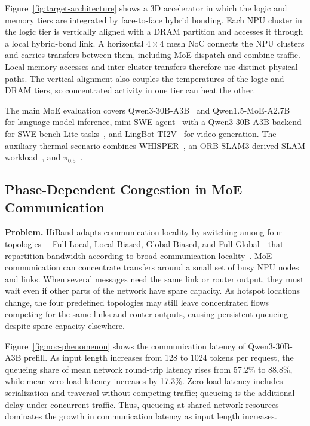 \documentclass[conference,10pt]{IEEEtran}
\begin{document}
Figure~\ref{fig:target-architecture} shows a 3D accelerator in which the
logic and memory tiers are integrated by face-to-face hybrid bonding.
Each NPU cluster in the logic tier is vertically aligned with a DRAM
partition and accesses it through a local hybrid-bond link. A horizontal
$4\times4$ mesh NoC connects the NPU clusters and carries transfers between
them, including MoE dispatch and combine traffic. Local memory accesses and
inter-cluster transfers therefore use distinct physical paths. The vertical
alignment also couples the temperatures of the logic and DRAM tiers, so
concentrated activity in one tier can heat the other.

The main MoE evaluation covers Qwen3-30B-A3B~\cite{qwen3report} and
Qwen1.5-MoE-A2.7B~\cite{qwen15moe} for language-model inference,
mini-SWE-agent~\cite{minisweagent} with a Qwen3-30B-A3B backend for
SWE-bench Lite tasks~\cite{swebench}, and LingBot TI2V~\cite{lingbotvideo}
for video generation. The auxiliary thermal scenario combines
WHISPER~\cite{whisper}, an ORB-SLAM3-derived SLAM workload~\cite{orbslam3},
and $\pi_{0.5}$~\cite{pi05}.


\subsection{Phase-Dependent Congestion in MoE Communication}

\noindent\textbf{Problem.}
HiBand adapts communication locality by switching among four topologies---
Full-Local, Local-Biased, Global-Biased, and Full-Global---that repartition
bandwidth according to broad communication locality~\cite{wang2026hiband}.
MoE communication can concentrate transfers around a small set of busy NPU
nodes and links. When several messages need the same link or router output,
they must wait even if other parts of the network have spare capacity.
As hotspot locations change, the four predefined topologies may still leave
concentrated flows competing for the same links and router outputs, causing
persistent queueing despite spare capacity elsewhere.

Figure~\ref{fig:noc-phenomenon} shows the communication latency of
Qwen3-30B-A3B prefill. As input length increases
from 128 to 1024 tokens per request, the queueing share of mean network
round-trip latency rises from 57.2\% to 88.8\%, while mean zero-load latency
increases by 17.3\%. Zero-load latency includes serialization and traversal
without competing traffic; queueing is the additional delay under concurrent
traffic. Thus, queueing at shared network resources dominates the growth in
communication latency as input length increases.
\end{document}
